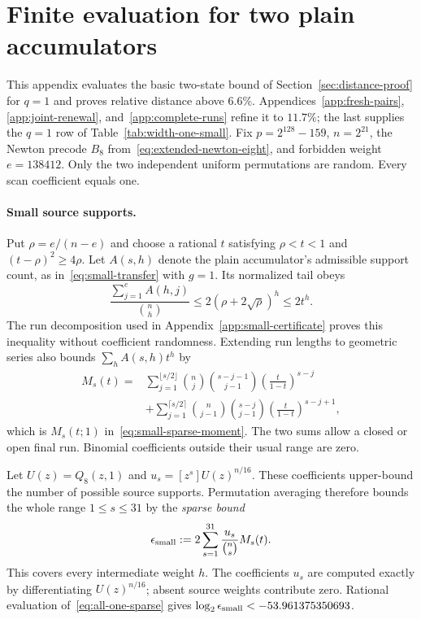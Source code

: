 \section{Finite evaluation for two plain accumulators}\label{app:all-one}

This appendix evaluates the basic two-state bound of
Section~\ref{sec:distance-proof} for $q=1$ and proves relative distance
above $6.6\%$. Appendices~\ref{app:fresh-pairs}, \ref{app:joint-renewal},
and~\ref{app:complete-runs} refine it to $11.7\%$; the last supplies the
$q=1$ row of Table~\ref{tab:width-one-small}. Fix $p=2^{128}-159$,
$n=2^{21}$, the Newton precode $B_8$ from~\eqref{eq:extended-newton-eight},
and forbidden weight $e=138412$. Only the two independent uniform
permutations are random. Every scan coefficient equals one.

\paragraph{Small source supports.}
Put $\rho=e/(n-e)$ and choose a rational $t$ satisfying
$\rho<t<1$ and $(t-\rho)^2\ge4\rho$. Let $A(s,h)$ denote the
plain accumulator's admissible support count, as
in~\eqref{eq:small-transfer} with $g=1$. Its normalized tail obeys
\[
 \frac{\sum_{j=1}^e A(h,j)}{\binom nh}
 \le 2(\rho+2\sqrt\rho)^h\le2t^h.
\]
The run decomposition used in Appendix~\ref{app:small-certificate}
proves this inequality without coefficient randomness. Extending run
lengths to geometric series also bounds $\sum_h A(s,h)t^h$ by
\begin{align*}
 M_s(t)={}&\sum_{j=1}^{\lfloor s/2\rfloor}
 \binom nj\binom{s-j-1}{j-1}
 \left(\frac{t}{1-t}\right)^{s-j}\\
 &+\sum_{j=1}^{\lceil s/2\rceil}
 \binom n{j-1}\binom{s-j}{j-1}
 \left(\frac{t}{1-t}\right)^{s-j+1},
\end{align*}
which is $M_s(t;1)$ in~\eqref{eq:small-sparse-moment}. The two sums
allow a closed or open final run. Binomial coefficients outside their
usual range are zero.

Let $U(z)=Q_8(z,1)$ and $u_s=[z^s]U(z)^{n/16}$. These coefficients
upper-bound the number of possible source supports. Permutation
averaging therefore bounds the whole range $1\le s\le31$ by the
\emph{sparse bound}
\begin{equation}\label{eq:all-one-sparse}
 \epsilon_{\rm small}
 :=2\sum_{s=1}^{31}\frac{u_s}{\binom ns}M_s(t).
\end{equation}
This covers every intermediate weight $h$. The coefficients $u_s$ are
computed exactly by differentiating $U(z)^{n/16}$; absent source weights
contribute zero. Rational evaluation of~\eqref{eq:all-one-sparse} gives
$\log_2\epsilon_{\rm small}<-53.961375350693$.

